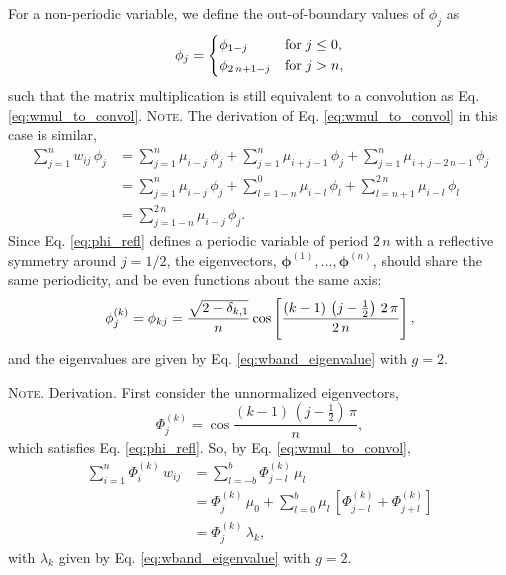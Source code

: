 \documentclass[reprint, superscriptaddress, floatfix]{revtex4-1}
\newcommand{\note}[1]{{\color{DarkGreen}\footnotesize \textsc{Note.} #1}}
\begin{document}
For a non-periodic variable,
we define the out-of-boundary values
of $\phi_j$ as
%
\begin{equation}
  \phi_j
  =
  \begin{dcases}
    \phi_{ 1 - j }           & \mathrm{for \;} j \le 0, \\
    \phi_{ 2 \, n + 1 - j }  & \mathrm{for \;} j > n,
  \end{dcases}
\label{eq:phi_refl}
\end{equation}
%
such that the matrix multiplication is still equivalent to
a convolution as Eq. \eqref{eq:wmul_to_convol}.
%
\note{The derivation of Eq. \eqref{eq:wmul_to_convol}
  in this case is similar,
  $$
  \begin{aligned}
    \sum_{j = 1}^n w_{ij} \, \phi_j
    &=
    \sum_{j = 1}^n
      \mu_{i - j} \, \phi_j
    +
    \sum_{j = 1}^n
      \mu_{i + j - 1} \, \phi_j
    +
    \sum_{j = 1}^n
      \mu_{i + j - 2 \, n - 1} \, \phi_j
    \\
    &=
    \sum_{j = 1}^n
      \mu_{i - j} \, \phi_j
    +
    \sum_{l = 1 - n}^0
      \mu_{i - l} \, \phi_l
    +
    \sum_{l = n + 1}^{ 2 \, n }
      \mu_{i - l} \, \phi_l
    \\
    &=
    \sum_{j = 1 - n}^{ 2 \, n}
      \mu_{i - j} \, \phi_j.
  \end{aligned}
  $$
}%
%
Since Eq. \eqref{eq:phi_refl}
defines a periodic variable of period $2 \, n$
with a reflective symmetry around $j = 1/2$,
the eigenvectors,
$\pmb\phi^{(1)}, \dots, \pmb\phi^{(n)}$,
should share the same periodicity,
and be even functions about the same axis:
%
\begin{equation}
  \phi^{(k)}_j
  =
  \phi_{k j}
  =
  \frac{ \sqrt{ 2 - \delta_{k, 1} } }
       {             n              }
  \cos \left[
       \frac{ ( k - 1) \, \left( j - \frac 1 2 \right) \, 2 \, \pi}
            {                    2 \, n                           }
       \right]
  ,
\notag
\end{equation}
%
and the eigenvalues are given by
  Eq. \eqref{eq:wband_eigenvalue}
  with $g = 2$.

\note{Derivation.
  First consider the unnormalized eigenvectors,
  $$
  \Phi^{(k)}_j
  =
  \cos \frac{ (k - 1) \, \left( j - \frac 1 2 \right) \, \pi }{n},
  $$
  which satisfies Eq. \eqref{eq:phi_refl}.
  So, by Eq. \eqref{eq:wmul_to_convol},
  $$
  \begin{aligned}
  \sum_{i = 1}^n
    \Phi^{(k)}_i \, w_{ij}
  &=
  \sum_{l = -b}^b
    \Phi^{(k)}_{j - l} \, \mu_l
  \\
  &=
    \Phi^{(k)}_j \, \mu_0
  + \sum_{l=0}^{b}
    \mu_l \,
    \left[
      \Phi^{(k)}_{j-l}
      +
      \Phi^{(k)}_{j+l}
    \right]
  \\
  &= \Phi^{(k)}_j \, \lambda_k,
  \end{aligned}
  $$
  with $\lambda_k$ given by Eq. \eqref{eq:wband_eigenvalue}
  with $g = 2$.
}%
%
\end{document}
